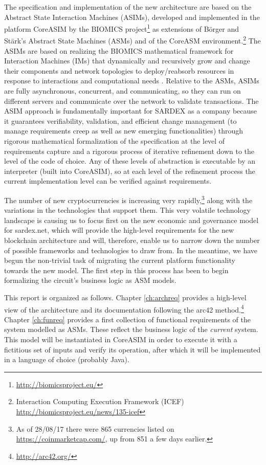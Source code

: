 The specification and implementation of the new architecture are based on the Abstract State Interaction Machines (ASIMs), developed and implemented in the platform CoreASIM by the BIOMICS project\footnote{\url{http://biomicsproject.eu/}} \cite{BIOMICSD41,BIOMICSD42,BIOMICSD52} as extensions of B\"orger and St\"ark's \cite{BoergerStaerk2003} Abstract State Machines (ASMs) and of the CoreASM environment.\footnote{Interaction Computing Execution Framework (ICEF) \url{http://biomicsproject.eu/news/135-icef}} The ASIMs are based on realizing the BIOMICS mathematical framework for Interaction Machines (IMs) that dynamically and recursively grow and change their components and network topologies to deploy/reabsorb resources in response to interactions and computational needs \cite{NehanivEtAl2015}. Relative to the ASMs, ASIMs are fully asynchronous, concurrent, and communicating, so they can run on different servers and communicate over the network to validate transactions. The ASIM approach is fundamentally important for SARDEX as a company because it guarantees verifiability, validation, and efficient change management (to manage requirements creep as well as new emerging functionalities) through rigorous mathematical formalization of the specification at the level of requirements capture and a rigorous process of iterative refinement down to the level of the code of choice. Any of these levels of abstraction is executable by an interpreter (built into CoreASIM), so at each level of the refinement process the current implementation level can be verified against requirements.

The number of new cryptocurrencies is increasing very rapidly,\footnote{As of 28/08/17 there were 865 currencies listed on \url{https://coinmarketcap.com/}, up from 851 a few days earlier.} along with the variations in the technologies that support them. This very volatile technology landscape is causing us to focus first on the new economic and governance model for sardex.net, which will provide the high-level requirements for the new blockchain architecture and will, therefore, enable us to narrow down the number of possible frameworks and technologies to draw from. In the meantime, we have begun the non-trivial task of migrating the current platform functionality towards the new model. The first step in this process has been to begin formalizing the circuit's business logic as ASM models.

This report is organized as follows. Chapter \ref{ch:archreq} provides a high-level view of the architecture and its documentation following the arc42 method.\footnote{\url{http://arc42.org/}} Chapter \ref{ch:funreq} provides a first collection of functional requirements of the system modelled as ASMs. These reflect the business logic of the \emph{current} system. This model will be instantiated in CoreASIM in order to execute it with a fictitious set of inputs and verify its operation, after which it will be implemented in a language of choice (probably Java).

